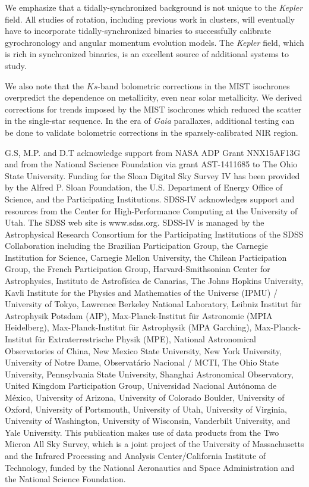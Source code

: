 \documentclass[twocolumn]{aastex6}
\newcommand{\Kepler}{\mbox{\textit{Kepler}}}
\newcommand{\Gaia}{\mbox{\textit{Gaia}}}
\begin{document}
We emphasize that a tidally-synchronized background is not unique to the
\Kepler{} field. All studies of rotation, including previous work in clusters,
will eventually have to incorporate tidally-synchronized binaries to
successfully calibrate gyrochronology and angular momentum evolution models.
The \Kepler{} field, which is rich in synchronized binaries, is an excellent 
source of additional systems to study.

We also note that the \(Ks\)-band bolometric corrections in the MIST 
isochrones overpredict the dependence on metallicity, even near solar 
metallicity. We derived corrections for trends imposed by the MIST isochrones 
which reduced the scatter in the single-star sequence. In the era of \Gaia{} 
parallaxes, additional testing can be done to validate bolometric corrections 
in the sparsely-calibrated NIR region.

\acknowledgments

G.S, M.P. and D.T acknowledge support from NASA ADP Grant NNX15AF13G and from
the National Sscience Foundation via grant AST-1411685 to The Ohio State
University. 
Funding for the Sloan Digital Sky Survey IV has been provided by the Alfred P.
Sloan Foundation, the U.S. Department of Energy Office of Science, and the
Participating Institutions. SDSS-IV acknowledges support and resources from the
Center for High-Performance Computing at the University of Utah. The SDSS web
site is www.sdss.org. SDSS-IV is managed by the Astrophysical Research
Consortium for the Participating Institutions of the SDSS Collaboration
including the Brazilian Participation Group, the Carnegie Institution for
Science, Carnegie Mellon University, the Chilean Participation Group, the
French Participation Group, Harvard-Smithsonian Center for Astrophysics,
Instituto de Astrof\'isica de Canarias, The Johns Hopkins University, Kavli
Institute for the Physics and Mathematics of the Universe (IPMU) / University
of Tokyo, Lawrence Berkeley National Laboratory, Leibniz Institut f\"ur
Astrophysik Potsdam (AIP), Max-Planck-Institut f\"ur Astronomie (MPIA
Heidelberg), Max-Planck-Institut f\"ur Astrophysik (MPA Garching),
Max-Planck-Institut f\"ur Extraterrestrische Physik (MPE), National
Astronomical Observatories of China, New Mexico State University, New York
University, University of Notre Dame, Observat\'ario Nacional / MCTI, The Ohio
State University, Pennsylvania State University, Shanghai Astronomical
Observatory, United Kingdom Participation Group, Universidad Nacional
Aut\'onoma de M\'exico, University of Arizona, University of Colorado Boulder,
University of Oxford, University of Portsmouth, University of Utah, University
of Virginia, University of Washington, University of Wisconsin, Vanderbilt
University, and Yale University.  This publication makes use of data products
from the Two Micron All Sky Survey, which is a joint project of the University
of Massachusetts and the Infrared Processing and Analysis Center/California
Institute of Technology, funded by the National Aeronautics and Space
Administration and the National Science Foundation. 
\end{document}
